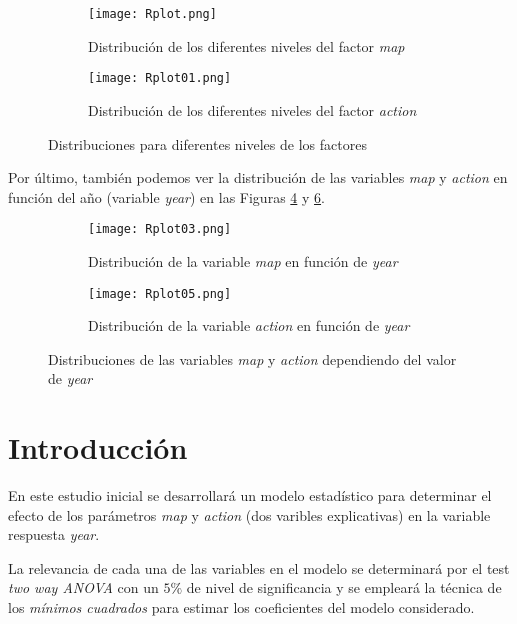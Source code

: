 \documentclass[10pt,a4paper]{article}
\begin{document}
\begin{figure}[!tbp]
  \begin{subfigure}[b]{0.49\textwidth}
    \texttt{[image: Rplot.png]}
    \caption{Distribución de los diferentes niveles del factor \emph{map}}
    \label{fig:yearmap}
  \end{subfigure}
  \hfill
  \begin{subfigure}[b]{0.49\textwidth}
    \texttt{[image: Rplot01.png]}
    \caption{Distribución de los diferentes niveles del factor \emph{action}}
    \label{fig:yearaction}
  \end{subfigure}
  \caption{Distribuciones para diferentes niveles de los factores}
\end{figure}

Por último, también podemos ver la distribución de las variables \emph{map} y \emph{action} en función del año (variable \emph{year}) en las Figuras \ref{fig:mapyear} y \ref{fig:actionyear}.

\begin{figure}[!tbp]
  \begin{subfigure}[b]{0.49\textwidth}
    \texttt{[image: Rplot03.png]}
    \caption{Distribución de la variable \emph{map} en función de \emph{year}}
    \label{fig:mapyear}
  \end{subfigure}
  \hfill
  \begin{subfigure}[b]{0.49\textwidth}
    \texttt{[image: Rplot05.png]}
    \caption{Distribución de la variable \emph{action} en función de \emph{year}}
    \label{fig:actionyear}
  \end{subfigure}
  \caption{Distribuciones de las variables \emph{map} y \emph{action} dependiendo del valor de \emph{year}}
\end{figure}

\section{Introducción}

En este estudio inicial se desarrollará un modelo estadístico para determinar el efecto de los parámetros \emph{map} y \emph{action} (dos varibles explicativas) en la variable respuesta \emph{year}.

La relevancia de cada una de las variables en el modelo se determinará por el test \emph{two way ANOVA} con un $5\%$ de nivel de significancia y se empleará la técnica de los \emph{mínimos cuadrados} para estimar los coeficientes del modelo considerado.
\end{document}
